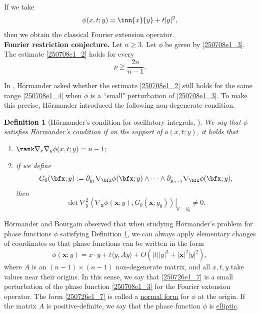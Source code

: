 \documentclass{article}
\numberwithin{equation}{section}
\theoremstyle{plain}
\newtheorem{definition}[theorem]{Definition}
\begin{document}
If we take 
\begin{equation}\label{250708e1_3}
\phi(x, t; y)= \inn{x}{y}+ t|y|^2,
\end{equation}
then we obtain the classical Fourier extension operator. \\

{\bf Fourier restriction conjecture.} Let $n\ge 3$. Let $\phi$ be given by \eqref{250708e1_3}. The estimate \eqref{250708e1_2} holds for every 
\begin{equation}\label{250708e1_4}
p\ge \frac{2n}{n-1}.
\end{equation}


In \cite{Hor73}, H\"ormander asked whether the estimate \eqref{250708e1_2} still holds for the same range \eqref{250708e1_4} when $\phi$ is a ``small" perturbation of \eqref{250708e1_3}. To make this precise, H\"ormander introduced the following non-degenerate condition.   

\begin{definition}[H\"ormander's condition for oscillatory integrals, \cite{Hor73}]\label{250726defi1_1}
We say that $\phi$ satisfies \underline{H\"ormander's condition} if  on the support of $a(x, t; y)$, it holds that 
\begin{enumerate}
\item[(H1)] $\rank \nabla_{x}\nabla_y \phi(x, t; y)=n-1;$ 
\item[(H2)] if we define 
\begin{equation}
G_0(\bfx; y):=\partial_{y_1} \nabla_{\bfx} \phi(\bfx; y)\wedge\dots\wedge\partial_{y_{n-1}} \nabla_{\bfx} \phi(\bfx; y),
\end{equation}
then 
\begin{equation}
\left.\operatorname{det} \nabla_{y}^2\left\langle\nabla_{\mathbf{x}} \phi(\mathbf{x} ; y), G_0\left(\mathbf{x} ; y_0\right)\right\rangle\right|_{y=y_0} \neq 0.
\end{equation}
\end{enumerate}
\end{definition}
H\"ormander \cite{Hor73} and Bourgain \cite{Bou91} observed that when studying H\"ormander's problem for phase functions $\phi$ satisfying Definition \ref{250726defi1_1}, we can always apply elementary changes of coordinates so that phase functions can be written in the form 
\begin{equation}\label{250726e1_7}
\phi(\mathbf{x} ; y)=x \cdot y+t\langle y, A y\rangle+O\left(|t||y|^3+|\mathbf{x}|^2|y|^2\right),
\end{equation}
where $A$ is an $(n-1)\times (n-1)$ non-degenerate matrix, and all $x, t, y$ take values near their origins. In this sense, we say that \eqref{250726e1_7} is a small perturbation of the phase function \eqref{250708e1_3} for the Fourier extension operator. The form \eqref{250726e1_7} is called a \underline{normal form} for $\phi$ at the origin. If the matrix $A$ is positive-definite, we say that the phase function $\phi$ is \underline{elliptic}. \\
\end{document}
